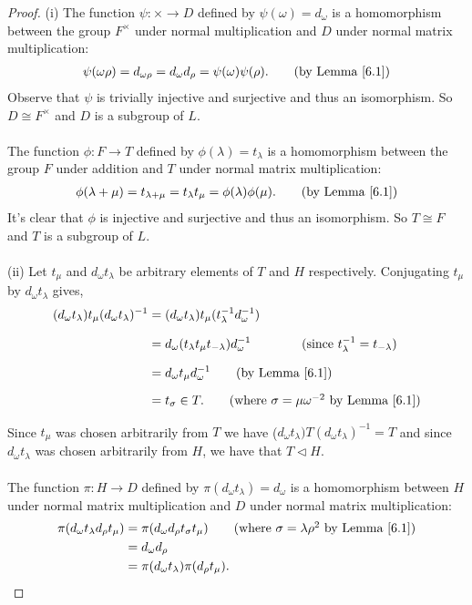 \begin{proof} 
(i) The function $\psi: \times \rightarrow D$ defined by $\psi(\omega) = d_\omega$ is a homomorphism between the group $F^\times$ under normal multiplication and $D$ under normal matrix multiplication:
\begin{align*} \psi(\omega \rho) = d_{\omega \rho} =  d_\omega d_\rho = \psi(\omega) \psi(\rho). \tag{by Lemma \ref{6.1}}
\end{align*}
Observe that $\psi$ is trivially injective and surjective and thus an isomorphism. So $D\cong F^\times$ and $D$ is a subgroup of $L$.\\
\\
 The function $\phi: F \rightarrow T$ defined by $\phi(\lambda) = t_\lambda$ is a homomorphism between the group $F$ under addition and $T$ under normal matrix multiplication:
\begin{align*} \phi(\lambda + \mu) = t_{\lambda + \mu} = t_\lambda t_\mu = \phi(\lambda) \phi(\mu). \tag{by Lemma \ref{6.1}}
\end{align*}
It's clear that $\phi$ is injective and surjective and thus an isomorphism. So $ T \cong F$ and $T$ is a subgroup of $L$. \\
\\
(ii) Let $t_\mu$ and $d_\omega t_\lambda$ be arbitrary elements of $T$ and $H$ respectively. Conjugating $t_\mu$ by $d_\omega t_\lambda$ gives,
\begin{align*} (d_\omega t_\lambda) t_\mu (d_\omega t_\lambda)^{-1} &= (d_\omega t_\lambda) t_\mu (t^{-1}_\lambda d^{-1}_\omega) \\[1.5ex]
&=
d_\omega (t_\lambda t_\mu t_{-\lambda}) d^{-1}_\omega \qquad \tag{since $t^{-1}_\lambda=t_{-\lambda}$} \\[1.5ex] 
&=
d_\omega t_\mu d^{-1}_\omega \tag{by Lemma \ref{6.1}} \\[1.5ex] 
&= t_\sigma \in T. \tag{where $\sigma = \mu \omega^{-2}$ by Lemma \ref{6.1}}
\end{align*}

Since $t_\mu$ was chosen arbitrarily from $T$ we have ($d_\omega t_\lambda) T (d_\omega t_\lambda)^{-1} = T$ and since $d_\omega t_\lambda$ was chosen arbitrarily from $H$, we have that $T \vartriangleleft H$. \\
\\
The function $\pi: H \rightarrow D$ defined by $\pi(d_\omega t_\lambda) = d_\omega$ is a homomorphism between $H$ under normal matrix multiplication and $D$ under normal matrix multiplication:
\begin{align*} \pi(d_\omega t_\lambda d_\rho t_\mu) &= \pi(d_\omega d_\rho t_\sigma t_\mu) \tag{where $\sigma = \lambda \rho^{2}$ by Lemma \ref{6.1}}
\\ &= d_\omega d_\rho
\\ &= \pi(d_\omega t_\lambda)\pi(d_\rho t_\mu).
\end{align*}


\end{proof}
